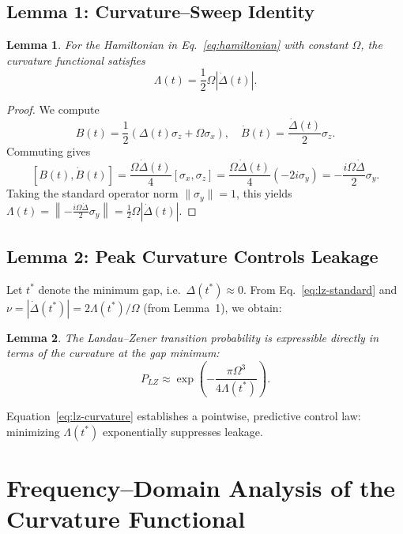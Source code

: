 \documentclass[11pt]{article}
\newtheorem{lemma}{Lemma}
\begin{document}
\subsection{Lemma 1: Curvature--Sweep Identity}

\begin{lemma}
For the Hamiltonian in Eq.~\eqref{eq:hamiltonian} with constant $\Omega$, the curvature functional satisfies
\begin{equation}
    \Lambda(t) = \frac{1}{2}\Omega|\dot{\Delta}(t)|.
    \label{eq:curvature-identity}
\end{equation}
\end{lemma}

\begin{proof}
We compute
\[
    B(t) = \frac{1}{2}(\Delta(t)\sigma_z + \Omega\sigma_x), \quad \dot{B}(t) = \frac{\dot{\Delta}(t)}{2}\sigma_z.
\]
Commuting gives
\[
    [B(t), \dot{B}(t)] = \frac{\Omega\dot{\Delta}(t)}{4}[\sigma_x, \sigma_z] = \frac{\Omega\dot{\Delta}(t)}{4}(-2i\sigma_y) = -\frac{i\Omega\dot{\Delta}}{2}\sigma_y.
\]
Taking the standard operator norm $\|\sigma_y\| = 1$, this yields $\Lambda(t) = \left\|-\frac{i\Omega\dot{\Delta}}{2}\sigma_y\right\| = \frac{1}{2}\Omega|\dot{\Delta}(t)|$.
\end{proof}

\subsection{Lemma 2: Peak Curvature Controls Leakage}

Let $t^*$ denote the minimum gap, i.e.\ $\Delta(t^*) \approx 0$. From Eq.~\eqref{eq:lz-standard} and $\nu = |\dot{\Delta}(t^*)| = 2\Lambda(t^*)/\Omega$ (from Lemma~1), we obtain:

\begin{lemma}
The Landau--Zener transition probability is expressible directly in terms of the curvature at the gap minimum:
\begin{equation}
    P_{LZ} \approx \exp\left(-\frac{\pi\Omega^3}{4\Lambda(t^*)}\right).
    \label{eq:lz-curvature}
\end{equation}
\end{lemma}

Equation~\eqref{eq:lz-curvature} establishes a pointwise, predictive control law: minimizing $\Lambda(t^*)$ exponentially suppresses leakage.

\section{Frequency--Domain Analysis of the Curvature Functional}
\end{document}
